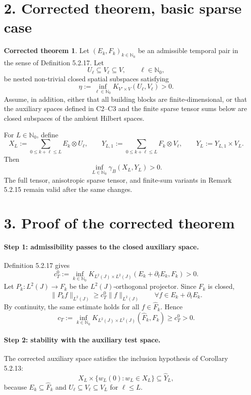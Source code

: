 \documentclass[11pt]{article}
\theoremstyle{definition}
\newtheorem*{theorem*}{Corrected theorem}
\newcommand{\Nzero}{\mathbb N_0}
\newcommand{\dd}{\partial_t}
\newcommand{\Ltwo}{L^2(J)}
\newcommand{\K}{K}
\newcommand{\gam}{\gamma_B}
\newcommand{\hatF}{\widehat F}
\newcommand{\hatY}{\widehat Y}
\begin{document}
\section*{2. Corrected theorem, basic sparse case}

\begin{theorem*}
Let \((E_k,F_k)_{k\in\Nzero}\) be an admissible temporal pair in the sense of Definition 5.2.17.  Let
\[
  U_\ell\subseteq V_\ell\subseteq V,
  \qquad \ell\in\Nzero,
\]
be nested non-trivial closed spatial subspaces satisfying
\[
  \eta:=\inf_{\ell\in\Nzero}\K_{V'\times V}(U_\ell,V_\ell)>0.
\]
Assume, in addition, either that all building blocks are finite-dimensional, or that the auxiliary spaces defined in \textnormal{C2--C3} and the finite sparse tensor sums below are closed subspaces of the ambient Hilbert spaces.

For \(L\in\Nzero\), define
\[
  X_L:=\sum_{0\le k+\ell\le L}E_k\otimes U_\ell,
  \qquad
  Y_{L,1}:=\sum_{0\le k+\ell\le L}F_k\otimes V_\ell,
  \qquad
  Y_L:=Y_{L,1}\times V_L .
\]
Then
\[
  \inf_{L\in\Nzero}\gam(X_L,Y_L)>0.
\]
The full tensor, anisotropic sparse tensor, and finite-sum variants in Remark 5.2.15 remain valid after the same changes.
\end{theorem*}

\section*{3. Proof of the corrected theorem}

\paragraph{Step 1: admissibility passes to the closed auxiliary space.}
Definition 5.2.17 gives
\[
  c_T^0:=\inf_{k\in\Nzero}
  \K_{\Ltwo\times\Ltwo}(E_k+\dd E_k,F_k)>0 .
\]
Let \(P_k:\Ltwo\to F_k\) be the \(L^2(J)\)-orthogonal projector.  Since \(F_k\) is closed,
\[
  \|P_k f\|_{L^2(J)}\ge c_T^0\|f\|_{L^2(J)}
  \qquad\forall f\in E_k+\dd E_k.
\]
By continuity, the same estimate holds for all \(f\in\hatF_k\).  Hence
\[
  c_T:=\inf_{k\in\Nzero}\K_{\Ltwo\times\Ltwo}(\hatF_k,F_k)\ge c_T^0>0 .
\]

\paragraph{Step 2: stability with the auxiliary test space.}
The corrected auxiliary space satisfies the inclusion hypothesis of Corollary 5.2.13:
\[
  X_L\times\{w_L(0):w_L\in X_L\}\subseteq \hatY_L,
\]
because \(E_k\subseteq \hatF_k\) and \(U_\ell\subseteq V_\ell\subseteq V_L\) for \(\ell\le L\).
\end{document}

